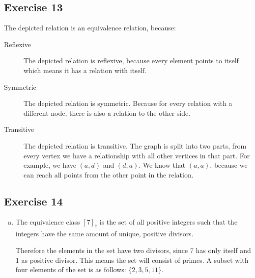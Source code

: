 \documentclass[a4paper]{article}
\newcommand{\exercise}[2]{\subsection*{Exercise #1}{#2}}
\newcommand{\exerciseenum}[2]{\subsection*{Exercise #1}{\begin{enumerate}[a)]#2\end{enumerate}}}
\begin{document}
\exercise{13}{%
The depicted relation is an equivalence relation, because:

\begin{description}
\item[Reflexive]
The depicted relation is reflexive, because every element points to itself which means it has a relation with itself.
\item[Symmetric]
The depicted relation is symmetric.
Because for every relation with a different node, there is also a relation to the other side.
\item[Transitive]
The depicted relation is transitive.
The graph is split into two parts, from every vertex we have a relationship with all other vertices in that part. For example, we have $(a, d)$ and $(d, a)$. We know that $(a, a)$, because we can reach all points from the other point in the relation.
\end{description}
}


\exerciseenum{14}{%
\addtocounter{enumi}{2}
\item%
The equivalence class $[7]_{\dagger}$ is the set of all positive
integers such that the integers have the same amount of unique, positive divisors.

Therefore the elements in the set have two divisors, since 7 has only itself and 1 as positive divisor. This means the set will consist of primes. A subset with four elements of the set is as follows: $\{2, 3, 5, 11\}$.
}
\end{document}
